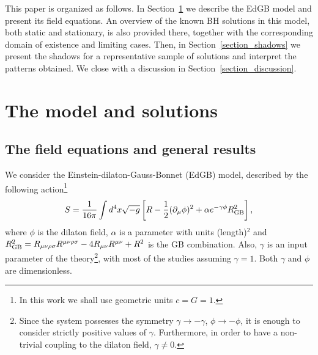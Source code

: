 \documentclass[12pt]{article}
\begin{document}
\bigskip

This paper is organized as follows. 
In Section~\ref{section_model} we describe the EdGB model and present its field equations. 
An overview of the known
BH solutions in this model, both static and stationary, 
is also provided there,
together with
the corresponding domain of existence and limiting cases. 
Then, in Section~\ref{section_shadows} we present the shadows for a representative sample of solutions 
and interpret the patterns obtained.
We close with a discussion in Section~\ref{section_discussion}.






\section{ The model and solutions}
\label{section_model}
 \subsection{ The field equations and general results }
 
We consider the Einstein-dilaton-Gauss-Bonnet (EdGB) model, described by the following action\footnote{In this work we shall use geometric units $c = G = 1$.}
\begin{eqnarray}  
S=\frac{1}{16 \pi  }\int d^4x \sqrt{-g} \left[R - \frac{1}{2}
 (\partial_\mu \phi)^2
 + \alpha  e^{-\gamma \phi} R^2_{\rm GB}   \right],
\label{act}
\end{eqnarray} 
where 
$\phi$ is the dilaton field, $\alpha $ is a parameter with units (length)$^2$ 
and
$R^2_{\rm GB} = R_{\mu\nu\rho\sigma} R^{\mu\nu\rho\sigma}
- 4 R_{\mu\nu} R^{\mu\nu} + R^2$ 
is the GB combination. 
Also, $\gamma$ is an input parameter of the theory\footnote{Since
the system possesses the symmetry $\gamma \to-\gamma$, $\phi\to -\phi$,
it is enough to consider strictly positive values of $\gamma$. Furthermore, in order to have a non-trivial coupling to the dilaton field, $\gamma\neq 0$.}, with most of the studies assuming $\gamma=1$. {Both $\gamma$ and $\phi$ are dimensionless.}
 
\end{document}

